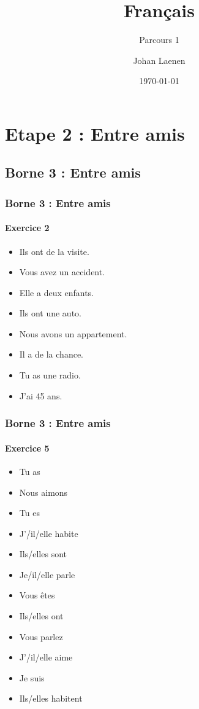 \documentclass{beamer}
\title{Français}
\subtitle{Parcours 1}
\author{Johan Laenen}
\date{\today}
\begin{document}
\frame{\titlepage}

\section[Outline]{}
\frame{\tableofcontents}



\section{Etape 2 : Entre amis}

\subsection{Borne 3 : Entre amis}

\frame
{
  \frametitle{Borne 3 : Entre amis}

  \framesubtitle{Exercice 2}
  
  \begin{itemize}
    \item Ils ont de la visite.
    \item Vous avez un accident.
    \item Elle a deux enfants.
    \item Ils ont une auto.
    \item Nous avons un appartement.
    \item Il a de la chance.
    \item Tu as une radio.
    \item J'ai 45 ans.
  \end{itemize}
}
\frame
{
  \frametitle{Borne 3 : Entre amis}

  \framesubtitle{Exercice 5}
  
  \begin{itemize}
    \item Tu as
    \item Nous aimons
    \item Tu es
    \item J'/il/elle habite
    \item Ils/elles sont
    \item Je/il/elle parle
    \item Vous êtes
    \item Ils/elles ont
    \item Vous parlez
    \item J'/il/elle aime
    \item Je suis
    \item Ils/elles habitent
  \end{itemize}
}
\end{document}
